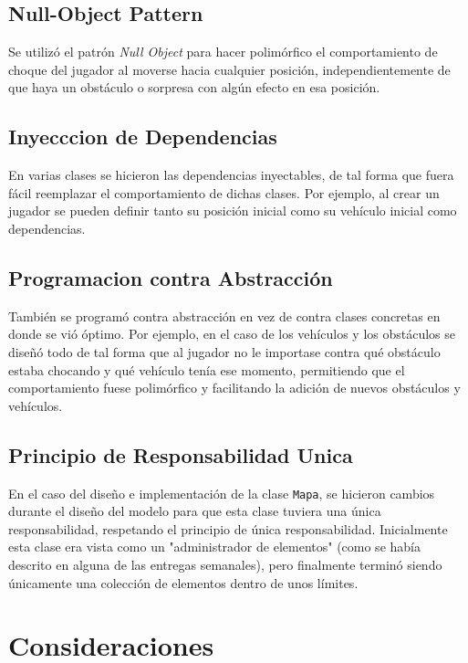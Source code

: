 \documentclass[titlepage,a4paper]{article}
\begin{document}
\subsection{Null-Object Pattern}
\label{sec:orgc6cf8f8}

Se utilizó el patrón \emph{Null Object} para hacer polimórfico el
comportamiento de choque del jugador al moverse hacia cualquier
posición, independientemente de que haya un obstáculo o sorpresa con
algún efecto en esa posición.

\subsection{Inyecccion de Dependencias}
\label{sec:org3663b15}

En varias clases se hicieron las dependencias inyectables, de tal
forma que fuera fácil reemplazar el comportamiento de dichas
clases. Por ejemplo, al crear un jugador se pueden definir tanto su
posición inicial como su vehículo inicial como dependencias.

\subsection{Programacion contra Abstracción}
\label{sec:orgbb1b2a4}

También se programó contra abstracción en vez de contra clases
concretas en donde se vió óptimo. Por ejemplo, en el caso de los
vehículos y los obstáculos se diseñó todo de tal forma que al jugador
no le importase contra qué obstáculo estaba chocando y qué vehículo
tenía ese momento, permitiendo que el comportamiento fuese polimórfico
y facilitando la adición de nuevos obstáculos y vehículos.

\subsection{Principio de Responsabilidad Unica}
\label{sec:org8fc2288}

En el caso del diseño e implementación de la clase \texttt{Mapa}, se hicieron
cambios durante el diseño del modelo para que esta clase tuviera una
única responsabilidad, respetando el principio de única
responsabilidad. Inicialmente esta clase era vista como un
"administrador de elementos" (como se había descrito en alguna de las
entregas semanales), pero finalmente terminó siendo únicamente una
colección de elementos dentro de unos límites.

\section{Consideraciones}
\label{sec:org662bd18}
\end{document}

